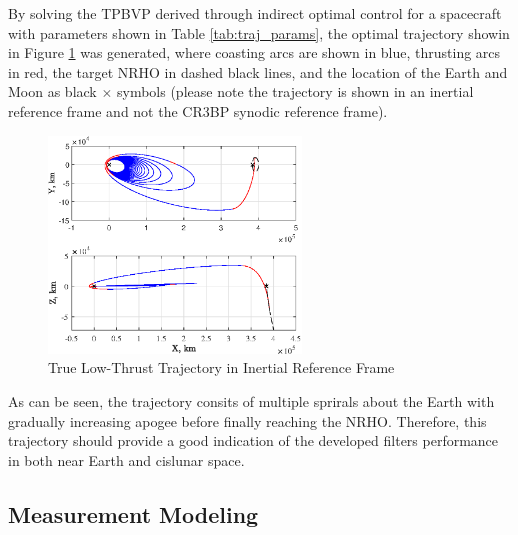 \documentclass[letterpaper, submit]{AAS}			%
\begin{document}
By solving the TPBVP derived through indirect optimal control for a spacecraft with parameters shown in Table \ref{tab:traj_params}, the optimal trajectory showin in Figure \ref{fig:traj} was generated, where coasting arcs are shown in blue, thrusting arcs in red, the target NRHO in dashed black lines, and the location of the Earth and Moon as black $\times$ symbols (please note the trajectory is shown in an inertial reference frame and not the CR3BP synodic reference frame).
\begin{figure}[hbt!]
	\centering
	\includegraphics[width=0.6\textwidth]{./../../figures/iTraj.eps}
	\caption{True Low-Thrust Trajectory in Inertial Reference Frame}
	\label{fig:traj}
\end{figure}
As can be seen, the trajectory consits of multiple sprirals about the Earth with gradually increasing apogee before finally reaching the NRHO. Therefore, this trajectory should provide a good indication of the developed filters performance in both near Earth and cislunar space.

\subsection{Measurement Modeling}
\end{document}
